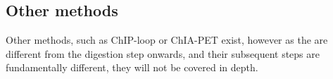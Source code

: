 





\subsection{Other methods}\label{sec:other3c}

Other methods, such as ChIP-loop or ChIA-PET exist, however as the are
different from the digestion step onwards, and their subsequent steps are
fundamentally different, they will not be covered in depth.




%
%
%
%
%
%





